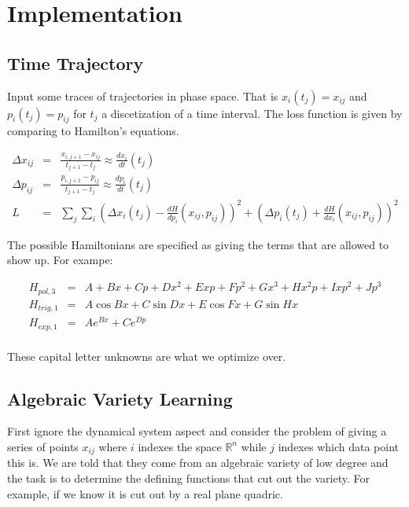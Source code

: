\documentclass[a4paper,landscape]{article}
\theoremstyle{change}
\theoremstyle{nonumberplain}
\numberwithin{equation}{section}
\begin{document}
\section{Implementation}

\subsection{Time Trajectory}

Input some traces of trajectories in phase space. That is $x_i (t_j) = x_{ij}$ and $p_i (t_j)=p_{ij}$ for $t_j$ a discetization of a time interval. The loss function is given by comparing to Hamilton's equations.

\begin{eqnarray*}
\Delta x_{ij} &=& \frac{x_{i,j+1} - x_{ij}}{t_{j+1} - t_j} \approx \frac{dx_i}{dt} (t_j)\\
\Delta p_{ij} &=& \frac{p_{i,j+1} - p_{ij}}{t_{j+1} - t_j} \approx \frac{dp_i}{dt} (t_j)\\
L &=& \sum_j \sum_i (\Delta x_i (t_j)  - \frac{dH}{dp_i} (x_{ij} , p_{ij} ))^2 + (\Delta p_i (t_j)  + \frac{dH}{dx_i} (x_{ij} , p_{ij} ))^2
\end{eqnarray*}

The possible Hamiltonians are specified as giving the terms that are allowed to show up. For exampe:

\begin{eqnarray*}
H_{pol,3} &=& A + Bx + Cp + Dx^2 + E xp + Fp^2 + G x^3 + H x^2 p + I xp^2 + J p^3\\
H_{trig,1} &=& A \cos B x + C \sin D x + E \cos F x + G \sin H x\\
H_{exp,1} &=& A e^{Bx} + C e^{Dp}\\
\end{eqnarray*}

These capital letter unknowns are what we optimize over.

\subsection{Algebraic Variety Learning}

First ignore the dynamical system aspect and consider the problem of giving a series of points $x_{ij}$ where $i$ indexes the space $\mathbb{R}^n$ while $j$ indexes which data point this is. We are told that they come from an algebraic variety of low degree and the task is to determine the defining functions that cut out the variety. For example, if we know it is cut out by a real plane quadric.
\end{document}
